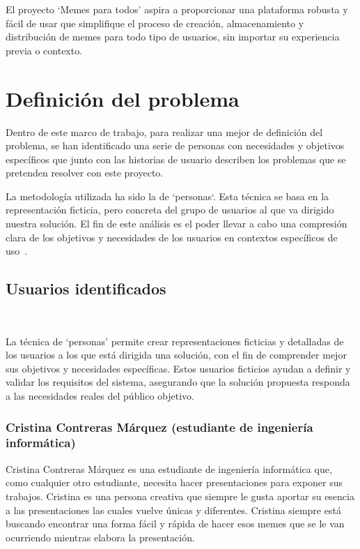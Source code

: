 El proyecto `Memes para todos' aspira a proporcionar una plataforma robusta y fácil de usar que simplifique el proceso de creación, almacenamiento y distribución de memes para todo tipo de usuarios, sin importar su experiencia previa o contexto.

\section{Definición del problema}

Dentro de este marco de trabajo, para realizar una mejor de definición del problema, se han identificado una serie de personas con necesidades y objetivos específicos que junto con las historias de usuario describen los problemas que se pretenden resolver con este proyecto.

La metodología utilizada ha sido la de `personas`. Esta técnica se basa en la representación ficticia, pero concreta del grupo de usuarios al que va dirigido nuestra solución. El fin de este análisis es el poder llevar a cabo una compresión clara de los objetivos y necesidades de los usuarios en contextos específicos de uso~\cite{cooper2014face}.

\subsection{Usuarios identificados}~\label{sec:usuarios_identificados}

La técnica de `personas' permite crear representaciones ficticias y detalladas de los usuarios a los que está dirigida una solución, con el fin de comprender mejor sus objetivos y necesidades específicas. Estos usuarios ficticios ayudan a definir y validar los requisitos del sistema, asegurando que la solución propuesta responda a las necesidades reales del público objetivo.

\subsubsection{Cristina Contreras Márquez (estudiante de ingeniería informática)}

Cristina Contreras Márquez es una estudiante de ingeniería informática que, como cualquier otro estudiante, necesita hacer presentaciones para exponer sus trabajos. Cristina es una persona creativa que siempre le gusta aportar su esencia a las presentaciones las cuales vuelve únicas y diferentes. Cristina siempre está buscando encontrar una forma fácil y rápida de hacer esos memes que se le van ocurriendo mientras elabora la presentación.

